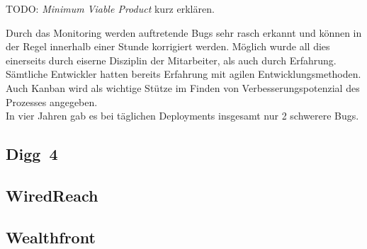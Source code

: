 \begin{wichtigbox}
TODO: \emph{Minimum Viable Product} kurz erklären.
\end{wichtigbox}

Durch das Monitoring werden auftretende Bugs sehr rasch erkannt und können  in
der Regel innerhalb einer Stunde korrigiert werden. Möglich wurde all dies
einerseits durch eiserne Disziplin der Mitarbeiter, als auch durch Erfahrung.
Sämtliche Entwickler hatten bereits Erfahrung mit agilen Entwicklungsmethoden.
Auch Kanban wird als wichtige Stütze im Finden von Verbesserungspotenzial des
Prozesses angegeben.\\
In vier Jahren gab es bei täglichen Deployments insgesamt nur 2 schwerere
Bugs.


\subsection{Digg~4}

\subsection{WiredReach}

\subsection{Wealthfront}
